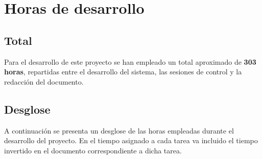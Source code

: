 
\pagestyle{fancy}
\fancyhead[LE,RO]{\thepage}
\fancyhead[LO]{\nouppercase{\rightmark}}

\chapter{Horas de desarrollo}

\minitoc
\section{Total}

Para el desarrollo de este proyecto se han empleado un total aproximado de \textbf{303 horas}, repartidas entre el desarrollo del sistema, las sesiones de control y la redacción del documento.

\section{Desglose}

A continuación se presenta un desglose de las horas empleadas durante el desarrollo del proyecto.
En el tiempo asignado a cada tarea va incluido el tiempo invertido en el documento correspondiente a dicha tarea.

